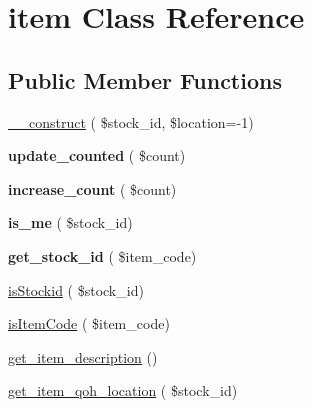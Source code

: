 \hypertarget{classitem}{}\section{item Class Reference}
\label{classitem}
\subsection*{Public Member Functions}
\begin{DoxyCompactItemize}
\item 
\hyperlink{classitem_a6034ca2afb124263ba90707959afaf41}{\+\_\+\+\_\+construct} ( \$stock\+\_\+id, \$location=-\/1)
\item 
\hypertarget{classitem_ac76cffc0c8c70c5e5aaeda74e35a55f8}{}\label{classitem_ac76cffc0c8c70c5e5aaeda74e35a55f8} 
{\bfseries update\+\_\+counted} ( \$count)
\item 
\hypertarget{classitem_aa3b7b9f2808a49c87af5043f38dd59d3}{}\label{classitem_aa3b7b9f2808a49c87af5043f38dd59d3} 
{\bfseries increase\+\_\+count} ( \$count)
\item 
\hypertarget{classitem_a210605b6202b2951189d6848fcd54b6e}{}\label{classitem_a210605b6202b2951189d6848fcd54b6e} 
{\bfseries is\+\_\+me} ( \$stock\+\_\+id)
\item 
\hypertarget{classitem_ac8ddae8b84bb5d8c044b0779e1843542}{}\label{classitem_ac8ddae8b84bb5d8c044b0779e1843542} 
{\bfseries get\+\_\+stock\+\_\+id} ( \$item\+\_\+code)
\item 
\hyperlink{classitem_a17a922f5ec3b2241675aea5ef0fdc8d5}{is\+Stockid} ( \$stock\+\_\+id)
\item 
\hyperlink{classitem_a9d1f895627df632f2134f0161d5da726}{is\+Item\+Code} ( \$item\+\_\+code)
\item 
\hyperlink{classitem_ac1e7020aea1578a37ba70dd37ba5ca13}{get\+\_\+item\+\_\+description} ()
\item 
\hyperlink{classitem_aa76507a7473d77d4f2472616abcb664f}{get\+\_\+item\+\_\+qoh\+\_\+location} ( \$stock\+\_\+id)
\end{DoxyCompactItemize}
